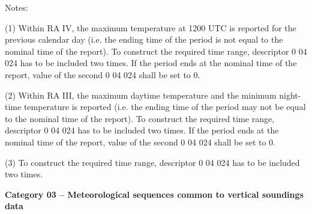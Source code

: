 Notes:

(1) Within RA IV, the maximum temperature at 1200 UTC is reported for the previous calendar day (i.e. the ending time of the period is not equal to the nominal time of the report). To construct the required time range, descriptor 0 04 024 has to be included two times. If the period ends at the nominal time of the report, value of the second 0 04 024 shall be set to 0.

(2) Within RA III, the maximum daytime temperature and the minimum night-time temperature is reported (i.e. the ending time of the period may not be equal to the nominal time of the report). To construct the required time range, descriptor 0 04 024 has to be included two times. If the period ends at the nominal time of the report, value of the second 0 04 024 shall be set to 0.

(3) To construct the required time range, descriptor 0 04 024 has to be included two times.

\textbf{Category 03 -- Meteorological sequences common to vertical soundings data}

